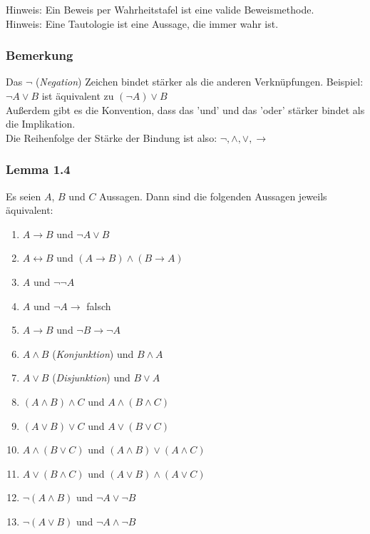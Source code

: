 \documentclass{article}
\begin{document}
Hinweis: Ein Beweis per Wahrheitstafel ist eine valide Beweismethode. \\
Hinweis: Eine Tautologie ist eine Aussage, die immer wahr ist. 

\subsubsection*{Bemerkung}
Das $\neg$ (\textit{Negation}) Zeichen bindet stärker als die anderen Verknüpfungen. Beispiel: \\
$\neg A \vee B$ ist äquivalent zu $(\neg A) \vee B$ \\
Außerdem gibt es die Konvention, dass das 'und' und das 'oder' stärker bindet als die Implikation. \\
Die Reihenfolge der Stärke der Bindung ist also: $\neg, \wedge, \vee, \rightarrow$ 


\subsubsection*{Lemma 1.4}
Es seien $A$, $B$ und $C$ Aussagen. Dann sind die folgenden Aussagen jeweils äquivalent: 
\begin{enumerate}
    \item $A \rightarrow B$ und $\neg A \vee B$
    \item $A \leftrightarrow B$ und $(A \rightarrow B) \wedge (B \rightarrow A)$
    \item $A$ und $\neg \neg A$
    \item $A$ und $\neg A \rightarrow $ falsch
    \item $A \rightarrow B$ und $\neg B \rightarrow \neg A$
    \item $A \wedge B$ (\textit{Konjunktion}) und $B \wedge A$
    \item $A \vee B$ (\textit{Disjunktion}) und $B \vee A$
    \item $(A \wedge B) \wedge C$ und $A \wedge (B \wedge C)$
    \item $(A \vee B) \vee C$ und $A \vee (B \vee C)$
    \item $A \wedge (B \vee C)$ und $(A \wedge B) \vee (A \wedge C)$
    \item $A \vee (B \wedge C)$ und $(A \vee B) \wedge (A \vee C)$
    \item $\neg (A \wedge B)$ und $\neg A \vee \neg B$
    \item $\neg (A \vee B)$ und $\neg A \wedge \neg B$
\end{enumerate}
\end{document}
